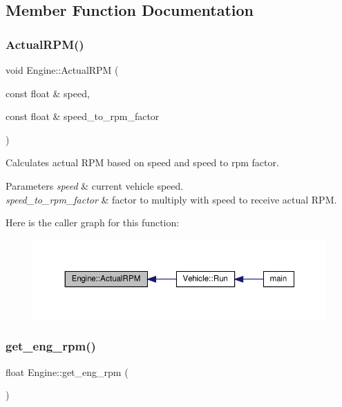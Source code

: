 \subsection{Member Function Documentation}
\mbox{\label{classEngine_a72bbd11160a8d916332b26e294133684}} 
\subsubsection{\texorpdfstring{Actual\+R\+P\+M()}{ActualRPM()}}
{\footnotesize\ttfamily void Engine\+::\+Actual\+R\+PM (\begin{DoxyParamCaption}\item[{const float \&}]{speed,  }\item[{const float \&}]{speed\+\_\+to\+\_\+rpm\+\_\+factor }\end{DoxyParamCaption})}

Calculates actual R\+PM based on speed and speed to rpm factor. 
\begin{DoxyParams}{Parameters}
{\em speed} & current vehicle speed. \\
\hline
{\em speed\+\_\+to\+\_\+rpm\+\_\+factor} & factor to multiply with speed to receive actual R\+PM. \\
\hline
\end{DoxyParams}
Here is the caller graph for this function\+:
\nopagebreak
\begin{figure}[H]
\begin{center}
\leavevmode
\includegraphics[width=350pt]{classEngine_a72bbd11160a8d916332b26e294133684_icgraph}
\end{center}
\end{figure}
\mbox{\label{classEngine_a31646756334221f7967a114c64f188f4}} 
\subsubsection{\texorpdfstring{get\+\_\+eng\+\_\+rpm()}{get\_eng\_rpm()}}
{\footnotesize\ttfamily float Engine\+::get\+\_\+eng\+\_\+rpm (\begin{DoxyParamCaption}{ }\end{DoxyParamCaption})}

